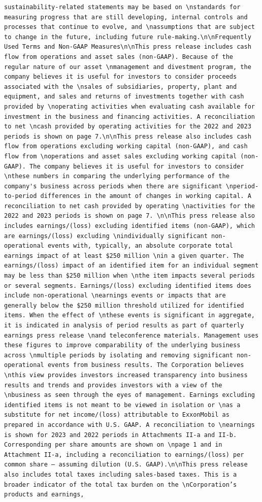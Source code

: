 \documentclass[
  letterpaper,
  DIV=11,
  numbers=noendperiod]{scrreprt}
\begin{document}
\begin{verbatim}
sustainability-related statements may be based on \nstandards for measuring progress that are still developing, internal controls and processes that continue to evolve, and \nassumptions that are subject to change in the future, including future rule-making.\n\nFrequently Used Terms and Non-GAAP Measures\n\nThis press release includes cash flow from operations and asset sales (non-GAAP). Because of the regular nature of our asset \nmanagement and divestment program, the company believes it is useful for investors to consider proceeds associated with the \nsales of subsidiaries, property, plant and equipment, and sales and returns of investments together with cash provided by \noperating activities when evaluating cash available for investment in the business and financing activities. A reconciliation to net \ncash provided by operating activities for the 2022 and 2023 periods is shown on page 7.\n\nThis press release also includes cash flow from operations excluding working capital (non-GAAP), and cash flow from \noperations and asset sales excluding working capital (non-GAAP). The company believes it is useful for investors to consider \nthese numbers in comparing the underlying performance of the company's business across periods when there are significant \nperiod-to-period differences in the amount of changes in working capital. A reconciliation to net cash provided by operating \nactivities for the 2022 and 2023 periods is shown on page 7. \n\nThis press release also includes earnings/(loss) excluding identified items (non-GAAP), which are earnings/(loss) excluding \nindividually significant non-operational events with, typically, an absolute corporate total earnings impact of at least $250 million \nin a given quarter. The earnings/(loss) impact of an identified item for an individual segment may be less than $250 million when \nthe item impacts several periods or several segments. Earnings/(loss) excluding identified items does include non-operational \nearnings events or impacts that are generally below the $250 million threshold utilized for identified items. When the effect of \nthese events is significant in aggregate, it is indicated in analysis of period results as part of quarterly earnings press release \nand teleconference materials. Management uses these figures to improve comparability of the underlying business across \nmultiple periods by isolating and removing significant non-operational events from business results. The Corporation believes \nthis view provides investors increased transparency into business results and trends and provides investors with a view of the \nbusiness as seen through the eyes of management. Earnings excluding identified items is not meant to be viewed in isolation or \nas a substitute for net income/(loss) attributable to ExxonMobil as prepared in accordance with U.S. GAAP. A reconciliation to \nearnings is shown for 2023 and 2022 periods in Attachments II-a and II-b. Corresponding per share amounts are shown on \npage 1 and in Attachment II-a, including a reconciliation to earnings/(loss) per common share – assuming dilution (U.S. GAAP).\n\nThis press release also includes total taxes including sales-based taxes. This is a broader indicator of the total tax burden on the \nCorporation’s products and earnings, 
\end{verbatim}
\end{document}
